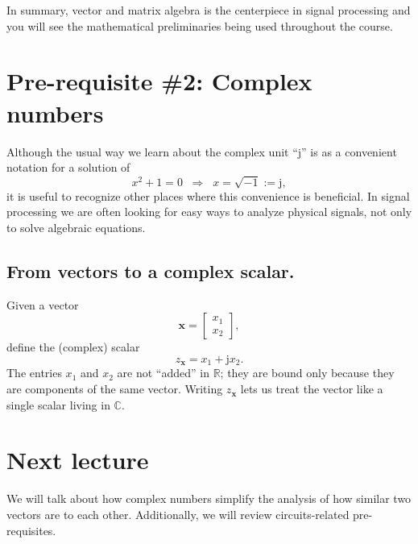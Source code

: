 In summary, vector and matrix algebra is the centerpiece in signal processing and you will see the mathematical preliminaries being used throughout the course.
\section{Pre-requisite \#2: Complex numbers}

Although the usual way we learn about the complex unit ``$\mathrm{j}$'' is as
a convenient notation for a solution of
\[
x^{2}+1=0 \;\;\Rightarrow\;\; x=\sqrt{-1}:=\mathrm{j},
\]
it is useful to recognize other places where this convenience is beneficial.
In signal processing we are often looking for easy ways to analyze physical
signals, not only to solve algebraic equations.

\subsection{From vectors to a complex scalar.}
Given a vector
\[
\mathbf{x}=\begin{bmatrix}x_1\\ x_2\end{bmatrix},
\]
define the (complex) scalar
\[
z_{\mathbf{x}}=x_1+\mathrm{j}x_2.
\]
The entries $x_1$ and $x_2$ are not ``added'' in $\mathbb{R}$; they are bound
only because they are components of the same vector. Writing $z_{\mathbf{x}}$
lets us treat the vector like a single scalar living in $\mathbb{C}$.

\section{Next lecture}
We will talk about how complex numbers simplify the analysis of how similar two vectors are to each other. Additionally, we will review circuits-related pre-requisites.
 